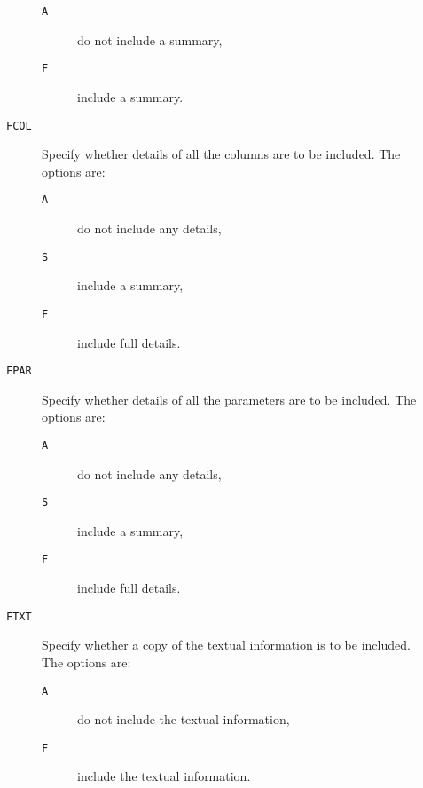\documentclass[twoside,11pt]{article}
\renewcommand{\_}{\texttt{\symbol{95}}}
\begin{document}
\begin{description}
\begin{description}
\begin{description}
      \item[ {\tt A} ] do not include a summary,

      \item[ {\tt F} ] include a summary.

    \end{description}

    \item[ {\tt FCOL} ] Specify whether details of all the columns are
     to be included. The options are:

    \begin{description}

      \item[ {\tt A} ] do not include any details,

      \item[ {\tt S} ] include a summary,

      \item[ {\tt F} ] include full details.

    \end{description}

    \item[ {\tt FPAR} ] Specify whether details of all the parameters are
     to be included. The options are:

    \begin{description}

      \item[ {\tt A} ] do not include any details,

      \item[ {\tt S} ] include a summary,

      \item[ {\tt F} ] include full details.

    \end{description}

    \item[ {\tt FTXT} ] Specify whether a copy of the textual information
     is to be included. The options are:

    \begin{description}

      \item[ {\tt A} ] do not include the textual information,

      \item[ {\tt F} ] include the textual information.

    \end{description}


\end{description}
\end{description}
\end{document}
